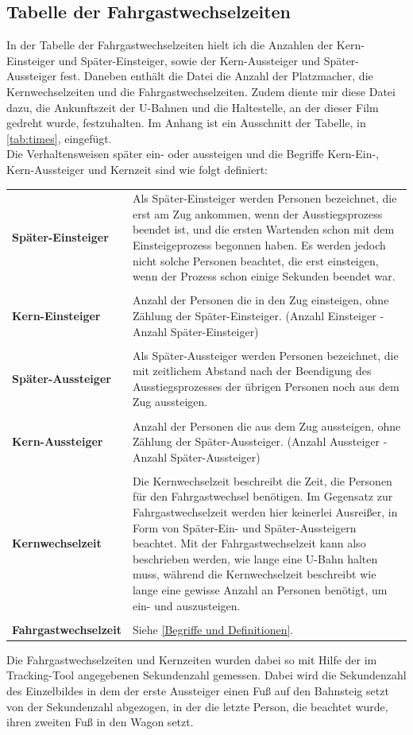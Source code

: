 \subsection{Tabelle der Fahrgastwechselzeiten} \label{Zeiten Tabelle}
In der Tabelle der Fahrgastwechselzeiten hielt ich die Anzahlen der Kern-Einsteiger und Später-Einsteiger, sowie der Kern-Aussteiger und Später-Aussteiger fest. Daneben enthält die Datei die Anzahl der Platzmacher, die Kernwechselzeiten und die Fahrgastwechselzeiten.
Zudem diente mir diese Datei dazu, die Ankunftszeit der U-Bahnen und die Haltestelle, an der dieser Film gedreht wurde, festzuhalten. Im Anhang ist ein Ausschnitt der Tabelle, in \tablename \ref{tab:times}, eingefügt. \\
Die Verhaltensweisen später ein- oder aussteigen und die Begriffe Kern-Ein-, Kern-Aussteiger und Kernzeit sind wie folgt definiert:
\begin{longtable}{l p{10.5 cm}}
	\centering
			\textbf{Später-Einsteiger} & Als Später-Einsteiger werden Personen bezeichnet, die erst am Zug ankommen, wenn der Ausstiegsprozess beendet ist, und die ersten Wartenden schon mit dem Einsteigeprozess begonnen haben. Es werden jedoch nicht solche Personen beachtet, die erst einsteigen, wenn der Prozess schon einige Sekunden beendet war.\\
			 & \\
			\textbf{Kern-Einsteiger} & Anzahl der Personen die in den Zug einsteigen, ohne Zählung der Später-Einsteiger. (Anzahl Einsteiger - Anzahl Später-Einsteiger) \\
			 & \\
			 \textbf{Später-Aussteiger} & Als Später-Aussteiger werden Personen bezeichnet, die mit zeitlichem Abstand nach der Beendigung des Ausstiegsprozesses der übrigen Personen noch aus dem Zug aussteigen.\\
			 & \\
			\textbf{Kern-Aussteiger} & Anzahl der Personen die aus dem Zug aussteigen, ohne Zählung der Später-Aussteiger. (Anzahl Aussteiger - Anzahl Später-Aussteiger)\\
			 & \\
			 \textbf{Kernwechselzeit} & Die Kernwechselzeit beschreibt die Zeit, die Personen für den Fahrgastwechsel benötigen. Im Gegensatz zur Fahrgastwechselzeit werden hier keinerlei Ausreißer, in Form von Später-Ein- und Später-Aussteigern beachtet. Mit der Fahrgastwechselzeit kann also beschrieben werden, wie lange eine U-Bahn halten muss, während die Kernwechselzeit beschreibt wie lange eine gewisse Anzahl an Personen benötigt, um ein- und auszusteigen. \\
			 & \\
			 \textbf{Fahrgastwechselzeit} & Siehe \ref{Begriffe und Definitionen}.
\end{longtable}
Die Fahrgastwechselzeiten und Kernzeiten wurden dabei so mit Hilfe der im Tracking-Tool angegebenen Sekundenzahl gemessen. Dabei wird die Sekundenzahl des Einzelbildes in dem der erste Aussteiger einen Fuß auf den Bahnsteig setzt von der Sekundenzahl abgezogen, in der die letzte Person, die beachtet wurde, ihren zweiten Fuß in den Wagon setzt.

